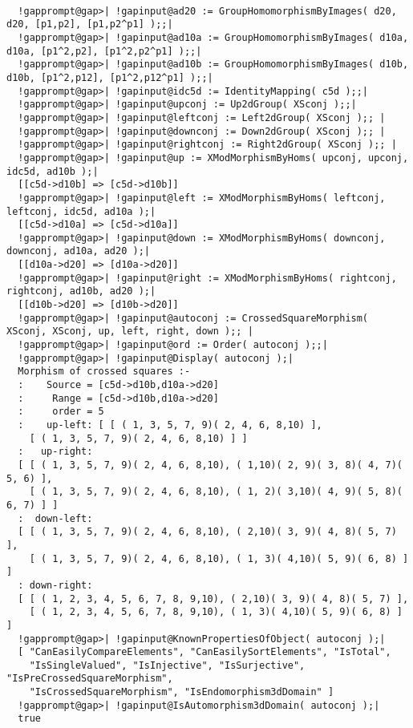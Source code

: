 \documentclass[a4paper,11pt]{report}
\begin{document}
{{ 

 
\begin{Verbatim}[commandchars=!@|,fontsize=\small,frame=single,label=Example]
  
  !gapprompt@gap>| !gapinput@ad20 := GroupHomomorphismByImages( d20, d20, [p1,p2], [p1,p2^p1] );;|
  !gapprompt@gap>| !gapinput@ad10a := GroupHomomorphismByImages( d10a, d10a, [p1^2,p2], [p1^2,p2^p1] );;|
  !gapprompt@gap>| !gapinput@ad10b := GroupHomomorphismByImages( d10b, d10b, [p1^2,p12], [p1^2,p12^p1] );;|
  !gapprompt@gap>| !gapinput@idc5d := IdentityMapping( c5d );;|
  !gapprompt@gap>| !gapinput@upconj := Up2dGroup( XSconj );;|
  !gapprompt@gap>| !gapinput@leftconj := Left2dGroup( XSconj );; |
  !gapprompt@gap>| !gapinput@downconj := Down2dGroup( XSconj );; |
  !gapprompt@gap>| !gapinput@rightconj := Right2dGroup( XSconj );; |
  !gapprompt@gap>| !gapinput@up := XModMorphismByHoms( upconj, upconj, idc5d, ad10b );|
  [[c5d->d10b] => [c5d->d10b]]
  !gapprompt@gap>| !gapinput@left := XModMorphismByHoms( leftconj, leftconj, idc5d, ad10a );|
  [[c5d->d10a] => [c5d->d10a]]
  !gapprompt@gap>| !gapinput@down := XModMorphismByHoms( downconj, downconj, ad10a, ad20 );|
  [[d10a->d20] => [d10a->d20]]
  !gapprompt@gap>| !gapinput@right := XModMorphismByHoms( rightconj, rightconj, ad10b, ad20 );|
  [[d10b->d20] => [d10b->d20]]
  !gapprompt@gap>| !gapinput@autoconj := CrossedSquareMorphism( XSconj, XSconj, up, left, right, down );; |
  !gapprompt@gap>| !gapinput@ord := Order( autoconj );;|
  !gapprompt@gap>| !gapinput@Display( autoconj );|
  Morphism of crossed squares :- 
  :    Source = [c5d->d10b,d10a->d20]
  :     Range = [c5d->d10b,d10a->d20]
  :     order = 5
  :    up-left: [ [ ( 1, 3, 5, 7, 9)( 2, 4, 6, 8,10) ], 
    [ ( 1, 3, 5, 7, 9)( 2, 4, 6, 8,10) ] ]
  :   up-right: 
  [ [ ( 1, 3, 5, 7, 9)( 2, 4, 6, 8,10), ( 1,10)( 2, 9)( 3, 8)( 4, 7)( 5, 6) ], 
    [ ( 1, 3, 5, 7, 9)( 2, 4, 6, 8,10), ( 1, 2)( 3,10)( 4, 9)( 5, 8)( 6, 7) ] ]
  :  down-left: 
  [ [ ( 1, 3, 5, 7, 9)( 2, 4, 6, 8,10), ( 2,10)( 3, 9)( 4, 8)( 5, 7) ], 
    [ ( 1, 3, 5, 7, 9)( 2, 4, 6, 8,10), ( 1, 3)( 4,10)( 5, 9)( 6, 8) ] ]
  : down-right: 
  [ [ ( 1, 2, 3, 4, 5, 6, 7, 8, 9,10), ( 2,10)( 3, 9)( 4, 8)( 5, 7) ], 
    [ ( 1, 2, 3, 4, 5, 6, 7, 8, 9,10), ( 1, 3)( 4,10)( 5, 9)( 6, 8) ] ]
  !gapprompt@gap>| !gapinput@KnownPropertiesOfObject( autoconj );|
  [ "CanEasilyCompareElements", "CanEasilySortElements", "IsTotal", 
    "IsSingleValued", "IsInjective", "IsSurjective", "IsPreCrossedSquareMorphism", 
    "IsCrossedSquareMorphism", "IsEndomorphism3dDomain" ]
  !gapprompt@gap>| !gapinput@IsAutomorphism3dDomain( autoconj );|
  true
  
\end{Verbatim}
 }

 }
\end{document}
